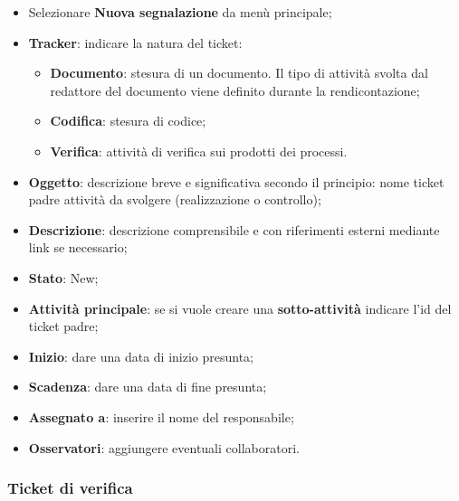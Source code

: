 		\begin{itemize}
		
		\item Selezionare \textbf{Nuova segnalazione} da menù principale; 
		\item \textbf{Tracker}: indicare la natura del ticket: 
		\begin{itemize}
	\item \textbf{Documento}: stesura di un documento. Il tipo di attività svolta dal redattore del documento viene definito durante la rendicontazione; 
	\item \textbf{Codifica}: stesura di codice; 
	\item \textbf{Verifica}: attività di verifica sui prodotti dei processi. 

	\end{itemize}

\item \textbf{Oggetto}: descrizione breve e significativa secondo il principio: nome ticket padre attività da svolgere (realizzazione o controllo); 
\item \textbf{Descrizione}: descrizione comprensibile e con riferimenti esterni mediante link se 
necessario; 

\item \textbf{Stato}: New; 
\item \textbf{Attività principale}: se si vuole creare una \textbf{sotto-attività} indicare l’id del ticket 
padre; 
\item \textbf{Inizio}: dare una data di inizio presunta; 
\item \textbf{Scadenza}: dare una data di fine presunta; 
\item \textbf{Assegnato a}: inserire il nome del responsabile; 
\item \textbf{Osservatori}: aggiungere eventuali collaboratori. 
\end{itemize} 

\subsubsection{Ticket di verifica}


